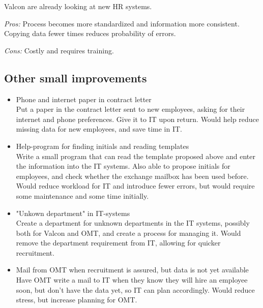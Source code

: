 Valcon are already looking at new HR systems.

\noindent \emph{Pros:} Process becomes more standardized and information more consistent. Copying data fewer times reduces probability of errors.

\noindent \emph{Cons:} Costly and requires training.

\subsection{Other small improvements}
\begin{itemize}
	\item Phone and internet paper in contract letter\\
	
			Put a paper in the contract letter sent to new employees, asking for their internet and phone preferences. Give it to IT upon return. Would help reduce missing data for new employees, and save time in IT.

	\item Help-program for finding initials and reading templates\\
	
			Write a small program that can read the template proposed above and enter the information into the IT systems.
			Also able to propose initials for employees, and check whether the exchange mailbox has been used before.
			Would reduce workload for IT and introduce fewer errors, but would require some maintenance and some time initially.
	
	\item "Unkown department" in IT-systems\\
	
			Create a department for unknown departments in the IT systems, possibly both for Valcon and OMT, and create a process for managing it.
			Would remove the department requirement from IT, allowing for quicker recruitment.
			
	\item Mail from OMT when recruitment is assured, but data is not yet available\\
	
			Have OMT write a mail to IT when they know they will hire an employee soon, but don't have the data yet, so IT can plan accordingly.
			Would reduce stress, but increase planning for OMT.
\end{itemize}